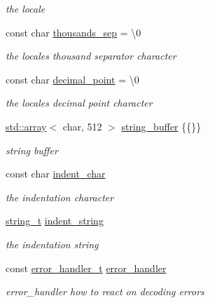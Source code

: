 \begin{DoxyCompactItemize}
\begin{DoxyCompactList}\small\item\em the locale \end{DoxyCompactList}\item 
const char \hyperlink{classnlohmann_1_1detail_1_1serializer_a78a6ae833bb6cf7f00cb0d51db114b14}{thousands\+\_\+sep} = \textquotesingle{}\textbackslash{}0\textquotesingle{}
\begin{DoxyCompactList}\small\item\em the locale\textquotesingle{}s thousand separator character \end{DoxyCompactList}\item 
const char \hyperlink{classnlohmann_1_1detail_1_1serializer_a311e5d6f4b31d5be0eb3c0cb20b6965a}{decimal\+\_\+point} = \textquotesingle{}\textbackslash{}0\textquotesingle{}
\begin{DoxyCompactList}\small\item\em the locale\textquotesingle{}s decimal point character \end{DoxyCompactList}\item 
\hyperlink{namespacenlohmann_1_1detail_a1ed8fc6239da25abcaf681d30ace4985af1f713c9e000f5d3f280adbd124df4f5}{std\+::array}$<$ char, 512 $>$ \hyperlink{classnlohmann_1_1detail_1_1serializer_a9c9b7ca63a66e59e5e7ffe8a2acf5c8f}{string\+\_\+buffer} \{\{\}\}
\begin{DoxyCompactList}\small\item\em string buffer \end{DoxyCompactList}\item 
const char \hyperlink{classnlohmann_1_1detail_1_1serializer_a9a55e6b028d09676fe35aefa0c72ea5b}{indent\+\_\+char}
\begin{DoxyCompactList}\small\item\em the indentation character \end{DoxyCompactList}\item 
\hyperlink{classnlohmann_1_1detail_1_1serializer_ad08aa54fac1dd0a453320c54137d45ba}{string\+\_\+t} \hyperlink{classnlohmann_1_1detail_1_1serializer_ae9268a10d88a5526e32735a55a132fc6}{indent\+\_\+string}
\begin{DoxyCompactList}\small\item\em the indentation string \end{DoxyCompactList}\item 
const \hyperlink{namespacenlohmann_1_1detail_a5a76b60b26dc8c47256a996d18d967df}{error\+\_\+handler\+\_\+t} \hyperlink{classnlohmann_1_1detail_1_1serializer_a09d5a046fb0f7cb61977d6e5fbe8b3a1}{error\+\_\+handler}
\begin{DoxyCompactList}\small\item\em error\+\_\+handler how to react on decoding errors \end{DoxyCompactList}\end{DoxyCompactItemize}
